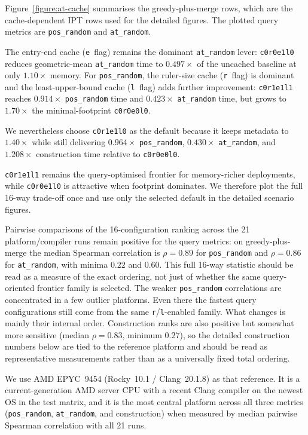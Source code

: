 \documentclass[manuscript,screen,review]{acmart}
\theoremstyle{definition}
\theoremstyle{plain}
\begin{document}
Figure~\ref{figure:at-cache} summarises the greedy-plus-merge rows,
which are the cache-dependent IPT rows used for the detailed figures.
The plotted query metrics are \texttt{pos\_random} and
\texttt{at\_random}.

The entry-end cache (\texttt{e}~flag) remains the dominant
\texttt{at\_random} lever: \texttt{c0r0e1l0} reduces geometric-mean
\texttt{at\_random} time to $0.497\times$ of the uncached baseline at
only $1.10\times$ memory. For \texttt{pos\_random}, the ruler-size cache
(\texttt{r}~flag) is dominant and the least-upper-bound cache
(\texttt{l}~flag) adds further improvement: \texttt{c0r1e1l1} reaches
$0.914\times$ \texttt{pos\_random} time and $0.423\times$
\texttt{at\_random} time, but grows to $1.70\times$ the
minimal-footprint \texttt{c0r0e0l0}.

We nevertheless choose \texttt{c0r1e1l0} as the default because it keeps
metadata to $1.40\times$ while still delivering $0.964\times$
\texttt{pos\_random}, $0.430\times$ \texttt{at\_random}, and $1.208\times$
construction time relative to \texttt{c0r0e0l0}.

\texttt{c0r1e1l1} remains the query-optimised frontier for
memory-richer deployments, while \texttt{c0r0e1l0} is attractive when
footprint dominates. We therefore plot the full 16-way trade-off once
and use only the selected default in the detailed scenario figures.

Pairwise comparisons of the 16-configuration ranking across the 21
platform/compiler runs remain positive for the query metrics:
on greedy-plus-merge the median Spearman correlation is
$\rho = 0.89$ for \texttt{pos\_random} and $\rho = 0.86$ for
\texttt{at\_random}, with
minima $0.22$ and $0.60$.
This full 16-way statistic should be read as a measure of the exact
ordering, not just of whether the same query-oriented frontier family is
selected.
The weaker \texttt{pos\_random} correlations are concentrated in a few
outlier platforms.
Even there the fastest query configurations still come from
the same \texttt{r}/\texttt{l}-enabled family. What changes is mainly
their internal order.
Construction ranks are also positive but somewhat more sensitive
(median $\rho = 0.83$, minimum $0.27$), so the detailed construction
numbers below are tied to the reference platform and should be read as
representative measurements rather than as a universally fixed total
ordering.

We use AMD EPYC~9454 (Rocky~10.1 / Clang~20.1.8) as that reference.
It is a current-generation AMD server CPU with a recent Clang compiler
on the newest OS in the test matrix, and it is the most central
platform across all three metrics (\texttt{pos\_random},
\texttt{at\_random}, and construction) when measured by median pairwise
Spearman correlation with all 21 runs.
\end{document}
